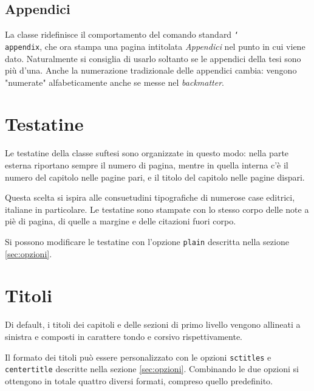 \documentclass{suftesi}
\DeclareRobustCommand*{\cs}[1]{\texttt{\char`\\#1}}
\newcommand*{\option}{\texttt}
\def\suftesi{\textsf{suftesi}}
\begin{document}
\subsection{Appendici}
La classe ridefinisce il comportamento del comando standard \cs{appendix}, che ora stampa una pagina intitolata \emph{Appendici} nel punto in cui viene dato. Naturalmente si consiglia di usarlo soltanto se le appendici della tesi sono più d'una. Anche la numerazione tradizionale delle appendici cambia: vengono "numerate" alfabeticamente anche se messe nel \emph{backmatter}.

\section{Testatine}

Le testatine della classe \suftesi{} sono organizzate in questo
modo: nella parte esterna riportano sempre il numero di pagina, mentre
in quella interna c'è il numero del capitolo nelle pagine pari, e il
titolo del capitolo nelle pagine dispari.

Questa scelta
 si ispira alle consuetudini tipografiche di numerose
case editrici, italiane in particolare. Le testatine sono stampate con
lo stesso corpo delle note a piè di pagina, di quelle a margine e
delle citazioni fuori corpo.

Si possono modificare le testatine con l'opzione \option{plain} descritta nella sezione \ref{sec:opzioni}.

\section{Titoli}

Di default, i titoli dei capitoli e delle sezioni di primo livello vengono allineati a sinistra e composti in carattere tondo e corsivo rispettivamente.

Il formato dei titoli può essere personalizzato con le opzioni \option{sctitles} e \option{centertitle} %
descritte nella sezione \ref{sec:opzioni}. Combinando le due opzioni si ottengono in totale quattro diversi formati, compreso quello predefinito.
\end{document}
